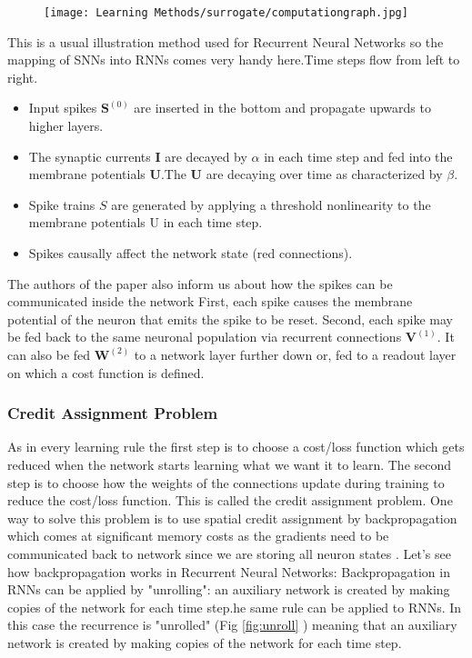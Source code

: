 \documentclass[12pt]{report}
\begin{document}
\begin{figure}[htp]
    \centering
    \texttt{[image: Learning Methods/surrogate/computationgraph.jpg]}
    \caption{}
    \label{fig:computationgraph}
\end{figure}
This is a usual illustration method used for Recurrent Neural Networks so the mapping of SNNs into RNNs comes very handy here.Time steps flow from left to right.
\begin{itemize}
    \item Input spikes $\mathbf{S}^{(0)}$ are inserted in the bottom and propagate upwards to higher layers.
    \item The synaptic currents $\mathbf{I}$ are decayed by $\alpha$ in each time step and fed into the membrane potentials $\mathbf{U}$.The $\mathbf{U}$ are decaying over time as characterized by $\beta .$
    \item Spike trains $S$ are generated by applying a threshold nonlinearity to the membrane potentials $\mathrm{U}$ in each time step.
    \item  Spikes causally affect the network state (red connections).
    
\end{itemize}
The authors of the paper also inform us about how the spikes can be communicated inside the network
First, each spike causes the membrane potential of the neuron that emits the spike to be reset. Second, each spike may be fed back to the same neuronal population via recurrent connections $\mathbf{V}^{(1)}$. It can also be fed $\mathbf{W}^{(2)}$ to a network layer further down or, fed to a readout layer on which a cost function is defined.
\subsubsection{Credit Assignment Problem}
As in every learning rule the first step is to choose a cost/loss function which gets reduced when the network starts learning what we want it to learn. The second step is to choose how the weights of the connections update during training to reduce the cost/loss function. This is called the credit assignment problem. One way to solve this problem is to use spatial credit assignment by backpropagation which comes at significant memory costs as the gradients need to be communicated back to network since we are storing all neuron states . Let's see how backpropagation works in Recurrent Neural Networks:
Backpropagation in RNNs can be applied by "unrolling": an auxiliary network is created by making copies of the network for each time step.he same rule can be applied to RNNs. In this case the recurrence is "unrolled" (Fig \ref{fig:unroll} ) meaning that an auxiliary network is created by making copies of the network for each time step.
\end{document}
